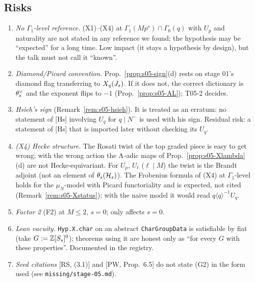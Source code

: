 \subsection{Risks}
\begin{enumerate}[label=R\arabic*.]
\item \emph{No $\Gamma_1$-level reference.} (X1)--(X4) at $\Gamma_1(Mp^s)\cap\Gamma_0(q)$ with $U_p$ and naturality are not
  stated in any reference we found; the hypothesis may be ``expected'' for a long time. Low impact (it stays a hypothesis by
  design), but the talk must not call it ``known''.
\item \emph{Diamond/Picard convention.} Prop.~\ref{prop:s05-sign}(d) rests on stage 01's diamond flag transferring to $X_q(J_s)$.
  If it does not, the correct dictionary is $\theta^\vee_s$ and the exponent flips to $-1$ (Prop.~\ref{prop:s05-AL}); T05-2 decides.
\item \emph{Hsieh's sign} (Remark~\ref{rem:s05-hsieh}). It is treated as an erratum: no statement of [Hs] involving $U_q$ for
  $q\mid N^-$ is used with his sign. Residual risk: a statement of [Hs] that is imported later without checking its $U_q$.
\item \emph{(X4) Hecke structure.} The Rosati twist of the top graded piece is easy to get wrong; with the wrong action the
  $\Lambda$-adic maps of Prop.~\ref{prop:s05-Xlambda}(d) are not Hecke-equivariant. For $U_p$, $U_\ell$ ($\ell\mid M$) the twist is
  the Brandt adjoint (not an element of $\theta_s(\mathcal{H}_s)$). The Frobenius formula of (X4) at $\Gamma_1$-level holds for the
  $\mu_N$-model with Picard functoriality and is expected, not cited (Remark~\ref{rem:s05-Xstatus}); with the naive model it would
  read $q\langle q\rangle^{-1}U_q$.
\item \emph{Factor 2} (F2) at $M\le2$, $s=0$; only affects $s=0$.
\item \emph{Lean vacuity.} \texttt{Hyp.X.char} on an abstract \texttt{CharGroupData} is satisfiable by fiat (take $G:=\mathbb{Z}[S_s]^0$);
  theorems using it are honest only as ``for every $G$ with these properties''. Documented in the registry.
\item \emph{Seed citations} [RS, (3.1)] and [PW, Prop.~6.5] do not state (G2) in the form used (see \texttt{missing/stage-05.md}).
\end{enumerate}

